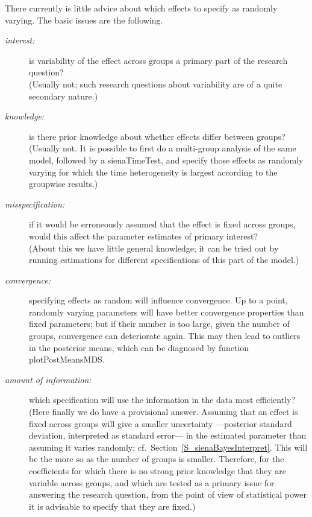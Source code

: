 \documentclass[a4paper,fleqn,11pt]{article}
\newcommand{\+}{\, + \,}
\newcommand{\sfn}[1]{\textsf{#1}}
\begin{document}
There currently is little advice about which effects to specify
as randomly varying.
The basic issues are the following.
\begin{description}
\item[\emph{interest:}] is variability of the effect across groups
   a primary part of the research question?\\
   (Usually not; such research questions about variability
   are of a quite secondary nature.)
\item[\emph{knowledge:}] is there prior knowledge about whether
   effects differ between groups?\\
   (Usually not. It is possible to first do a multi-group analysis of the same model,
   followed by a \sfn{sienaTimeTest}, and specify those effects as randomly
   varying for which the time heterogeneity is largest according to the
   groupwise results.)
\item[\emph{misspecification:}] if it would be erroneously assumed
    that the effect is fixed across groups, would this affect
    the parameter estimates of primary interest?\\
    (About this we have little general knowledge; it can be tried out
    by running estimations for different specifications of this
    part of the model.)
\item[\emph{convergence:}] specifying effects as random will
    influence convergence. Up to a point, randomly varying parameters
    will have better convergence properties than fixed parameters;
    but if their number is too large, given the number of groups,
    convergence can deteriorate again.
    This may then lead to outliers in the posterior means,
    which can be diagnosed by function \sfn{plotPostMeansMDS}.
\item[\emph{amount of information:}] which specification will
     use the information in the data most efficiently?\\
     (Here finally we do have a provisional answer. Assuming that an effect is fixed
     across groups will give a smaller uncertainty ---posterior standard
     deviation, interpreted as standard error--- in the estimated parameter
     than assuming it varies randomly;
     cf.\ Section~\ref{S_sienaBayesInterpret}.
     This will be the more so as the number of
     groups is smaller. Therefore, for the coefficients for which
     there is no strong prior knowledge that they are variable across groups,
     and which are tested as a primary issue for answering the research question,
     from the point of view of statistical power
     it is advisable to specify that they are fixed.)
\end{description}
\end{document}
